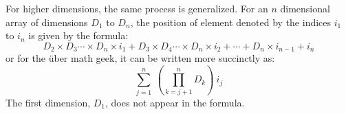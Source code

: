 For higher dimensions, the same process is generalized. For an $n$ dimensional
array of dimensions $D_1$ to $D_n$, the position of element denoted by the
indices $i_1$ to $i_n$ is given by the formula:
\begin{displaymath}
D_2 \times D_3 \cdots \times D_n \times i_1 + D_3 \times D_4 \cdots \times D_n 
\times i_2 + \cdots + D_n \times i_{n-1} + i_n
\end{displaymath}
or for the \"{u}ber math geek, it can be written more succinctly as:
\begin{displaymath}
\sum_{j=1}^{n} \: \left( \prod_{k=j+1}^{n} D_k \right) \: i_j
\end{displaymath}
The first dimension, $D_1$, does not appear in the formula.

